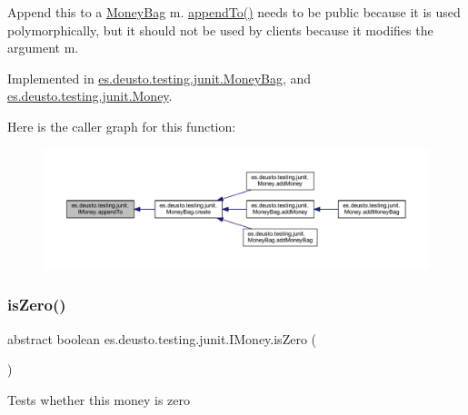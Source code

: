 Append this to a \mbox{\hyperlink{classes_1_1deusto_1_1testing_1_1junit_1_1_money_bag}{Money\+Bag}} m. \mbox{\hyperlink{interfacees_1_1deusto_1_1testing_1_1junit_1_1_i_money_ae45bc758e69a0017f083f11d050c53cb}{append\+To()}} needs to be public because it is used polymorphically, but it should not be used by clients because it modifies the argument m. 

Implemented in \mbox{\hyperlink{classes_1_1deusto_1_1testing_1_1junit_1_1_money_bag_ac8a5877b35b12939ce14543872ed18af}{es.\+deusto.\+testing.\+junit.\+Money\+Bag}}, and \mbox{\hyperlink{classes_1_1deusto_1_1testing_1_1junit_1_1_money_aa9a6df9f35118060914ae6e8f74d1d51}{es.\+deusto.\+testing.\+junit.\+Money}}.

Here is the caller graph for this function\+:\nopagebreak
\begin{figure}[H]
\begin{center}
\leavevmode
\includegraphics[width=350pt]{interfacees_1_1deusto_1_1testing_1_1junit_1_1_i_money_ae45bc758e69a0017f083f11d050c53cb_icgraph}
\end{center}
\end{figure}
\mbox{\label{interfacees_1_1deusto_1_1testing_1_1junit_1_1_i_money_a166c39b6f931e49769580a04f8c73500}} 
\subsubsection{\texorpdfstring{is\+Zero()}{isZero()}}
{\footnotesize\ttfamily abstract boolean es.\+deusto.\+testing.\+junit.\+I\+Money.\+is\+Zero (\begin{DoxyParamCaption}{ }\end{DoxyParamCaption})\hspace{0.3cm}{\ttfamily [abstract]}}

Tests whether this money is zero 

